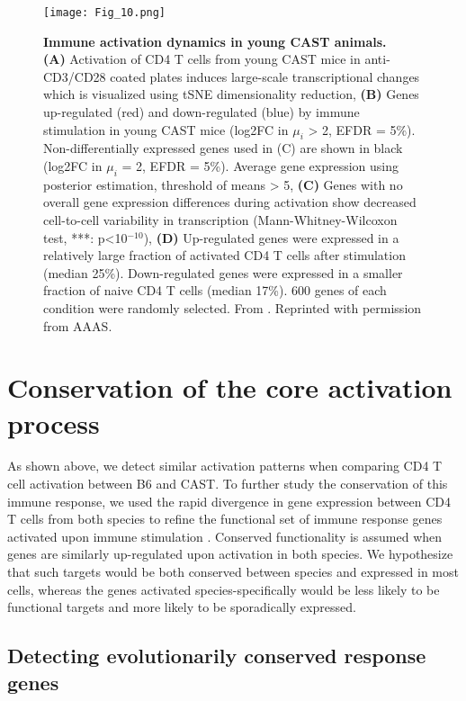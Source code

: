 \begin{figure}[!ht]
\centering
\texttt{[image: Fig\_10.png]}
\caption[Immune activation dynamics in young CAST animals]{\textbf{Immune activation dynamics in young CAST animals.}\\
\textbf{(A)} Activation of CD4\plus{} T cells from young CAST mice in anti-CD3\textepsilon{}/CD28 coated plates induces large-scale transcriptional changes which is visualized using tSNE dimensionality reduction, \textbf{(B)} Genes up-regulated (red) and down-regulated (blue) by immune stimulation in young CAST mice (log2FC in $\mu_i$ > 2, EFDR = 5\%). Non-differentially expressed genes used in (C) are shown in black (log2FC in $\mu_i$ = 2, EFDR = 5\%). Average gene expression using posterior estimation, threshold of means > 5, \textbf{(C)} Genes with no overall gene expression differences during activation show decreased cell-to-cell variability in transcription (Mann-Whitney-Wilcoxon test, ***: p<10$^{-10}$), \textbf{(D)} Up-regulated genes were expressed in a relatively large fraction of activated CD4\plus{} T cells after stimulation (median 25\%). Down-regulated genes were expressed in a smaller fraction of naive CD4\plus{} T cells (median 17\%). 600 genes of each condition were randomly selected. From \citep{Martinez-jimenez2017}. Reprinted with permission from AAAS.}
\label{fig1:immune_activation_CAST}
\end{figure}

\newpage

\section{Conservation of the core activation process}

As shown above, we detect similar activation patterns when comparing CD4\plus{} T cell activation between B6 and CAST. To further study the conservation of this immune response, we used the rapid divergence in gene expression between CD4\plus{} T cells from both species to refine the functional set of immune response genes activated upon immune stimulation \citep{Shay2013}. Conserved functionality is assumed when genes are similarly up-regulated upon activation in both species. We hypothesize that such targets would be both conserved between species and expressed in most cells, whereas the genes activated species-specifically would be less likely to be functional targets and more likely to be sporadically expressed.

\subsection{Detecting evolutionarily conserved response genes}

